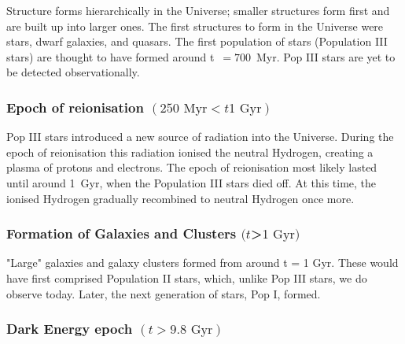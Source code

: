 \documentclass[]{book}
\begin{document}
Structure forms hierarchically in the Universe; smaller structures form
first and are built up into larger ones. The first structures to form in
the Universe were stars, dwarf galaxies, and quasars. The first
population of stars (Population III stars) are thought to have formed
around t~\(=700\)~Myr. Pop III stars are yet to be detected
observationally.

\hypertarget{epoch-of-reionisation-250-text-myr-t-1text-gyr}{%
\subsubsection*{\texorpdfstring{Epoch of reionisation \((250 \text{ Myr} < t 1\text{ Gyr})\)}{Epoch of reionisation (250 \textbackslash{}text\{ Myr\} \textless{} t 1\textbackslash{}text\{ Gyr\})}}\label{epoch-of-reionisation-250-text-myr-t-1text-gyr}}

Pop III stars introduced a new source of radiation into the Universe.
During the epoch of reionisation this radiation ionised the neutral
Hydrogen, creating a plasma of protons and electrons. The epoch of
reionisation most likely lasted until around 1~Gyr, when the Population
III stars died off. At this time, the ionised Hydrogen gradually
recombined to neutral Hydrogen once more.

\hypertarget{formation-of-galaxies-and-clusters-t1-text-gyr}{%
\subsubsection*{\texorpdfstring{Formation of Galaxies and Clusters \((t\)\textgreater{}\(1 \text{ Gyr})\)}{Formation of Galaxies and Clusters (t\textgreater{}1 \textbackslash{}text\{ Gyr\})}}\label{formation-of-galaxies-and-clusters-t1-text-gyr}}

"Large" galaxies and galaxy clusters formed from around t = 1 Gyr.
These would have first comprised Population II stars, which, unlike Pop
III stars, we do observe today. Later, the next generation of stars, Pop
I, formed.

\hypertarget{dark-energy-epoch-t-9.8-text-gyr}{%
\subsubsection*{\texorpdfstring{Dark Energy epoch \((t > 9.8 \text{ Gyr})\)}{Dark Energy epoch (t \textgreater{} 9.8 \textbackslash{}text\{ Gyr\})}}\label{dark-energy-epoch-t-9.8-text-gyr}}
\end{document}
